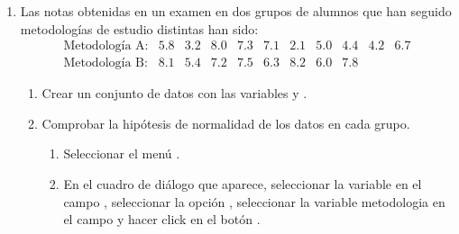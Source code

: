 \begin{enumerate}[leftmargin=*]
\item Las notas obtenidas en un examen en dos grupos de alumnos que han seguido metodologías de estudio distintas han sido:
\[
\begin{array}{lrrrrrrrrrr}
\text{Metodología A:} & 5.8 & 3.2 & 8.0 & 7.3 & 7.1 & 2.1 & 5.0 & 4.4 & 4.2 & 6.7\\
\text{Metodología B:} & 8.1 & 5.4 & 7.2 & 7.5 & 6.3 & 8.2 & 6.0 & 7.8 
\end{array}
\]
\begin{enumerate}
\item Crear un conjunto de datos con las variables  y .

\item Comprobar la hipótesis de normalidad de los datos en cada grupo.
\begin{indicacion}{
\begin{enumerate}
\item Seleccionar el menú .
\item En el cuadro de diálogo que aparece, seleccionar la variable  en el campo ,
seleccionar la opción , seleccionar la variable {metodologia} en el campo  y
hacer click en el botón .
\end{enumerate}
}
\end{indicacion}



\end{enumerate}
\end{enumerate}

